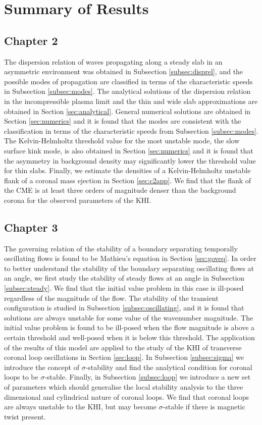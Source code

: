 \section{Summary of Results}

\subsection{Chapter 2}

The dispersion relation of waves propagating along a steady slab in an asymmetric environment was obtained in Subsection \ref{subsec:disprel}, and the possible modes of propagation are classified in terms of the characteristic speeds in Subsection \ref{subsec:modes}.
The analytical solutions of the dispersion relation in the incompressible plasma limit and the thin and wide slab approximations are obtained in Section \ref{sec:analytical}.
General numerical solutions are obtained in Section \ref{sec:numerics} and it is found that the modes are consistent with the classification in terms of the characteristic speeds from Subsection \ref{subsec:modes}.
The Kelvin-Helmholtz threshold value for the most unstable mode, the slow surface kink mode, is also obtained in Section \ref{sec:numerics} and it is found that the asymmetry in background density may significantly lower the threshold value for thin slabs.
Finally, we estimate the densities of a Kelvin-Helmholtz unstable flank of a coronal mass ejection in Section \ref{sec:c2app}.
We find that the flank of the CME is at least three orders of magnitude denser than the background corona for the observed parameters of the KHI.

\subsection{Chapter 3}

The governing relation of the stability of a boundary separating temporally oscillating flows is found to be Mathieu's equation in Section \ref{sec:goveq}.
In order to better understand the stability of the boundary separating oscillating flows at an angle, we first study the stability of steady flows at an angle in Subsection \ref{subsec:steady}.
We find that the initial value problem in this case is ill-posed regardless of the magnitude of the flow.
The stability of the transient configuration is studied in Subsection \ref{subsec:oscillating}, and it is found that solutions are always unstable for some value of the wavenumber magnitude.
The initial value problem is found to be ill-posed when the flow magnitude is above a certain threshold and well-posed when it is below this threshold.
The application of the results of this model are applied to the study of the KHI of transverse coronal loop oscillations in Section \ref{sec:loop}.
In Subsection \ref{subsec:sigma} we introduce the concept of $\sigma$-stability and find the analytical condition for coronal loops to be $\sigma$-stable.
Finally, in Subsection \ref{subsec:loop} we introduce a new set of parameters which should generalise the local stability analysis to the three dimensional and cylindrical nature of coronal loops.
We find that coronal loops are always unstable to the KHI, but may become $\sigma$-stable if there is magnetic twist present.

